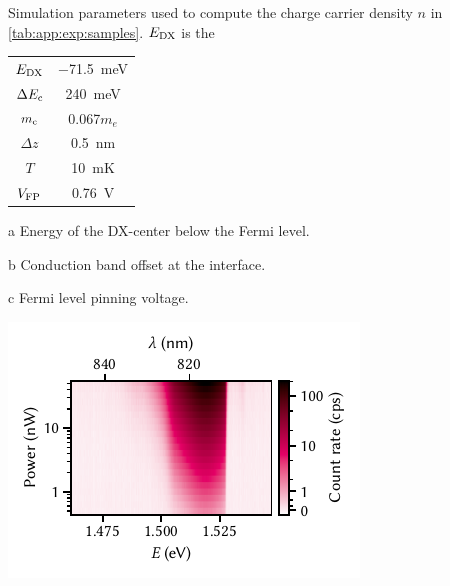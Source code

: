 \begin{margintable}
    \centering
    \footnotesize
    \begin{threeparttable}
        \caption{
            Simulation parameters used to compute the charge carrier density $n$ in \cref{tab:app:exp:samples}.
            $E_{\mathrm{DX}}$ is the
        }
        \label{tab:app:exp:samples:ps}
        \begin{tabularx}{2cm}{c c}
            \toprule
            $E_{\mathrm{DX}}$\tnote{a}          & \qty{-71.5}{meV} \\
            $\Delta E_{\mathrm{c}}$\tnote{b}    & \qty{240}{meV} \\
            $m_{\mathrm{c}}$                    & \num{0.067}{$m_e$} \\
            $\Delta z$                      & \qty{0.5}{nm} \\
            $T$                             & \qty{10}{mK} \\
            $V_{\mathrm{FP}}$\tnote{c}          & \qty{0.76}{V} \\
            \bottomrule
        \end{tabularx}
        \begin{tablenotes}
            \scriptsize
            \item[a] Energy of the DX-center below the Fermi level.
            \item[b] Conduction band offset at the  interface.
            \item[c] Fermi level pinning voltage.
        \end{tablenotes}
    \end{threeparttable}
\end{margintable}
%

\begin{marginfigure}
    \centering
    \includegraphics{img/pdf/experiment/2deg_pl_power_dependence}
    \caption[
        .
        \protect\newline
    ]{}
    \label{fig:app:exp:observations:2deg_pl_power_dependence}
\end{marginfigure}

